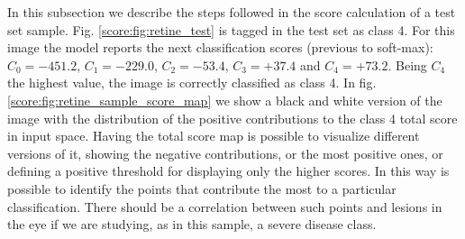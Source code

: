 In this subsection we describe the steps followed in the score calculation of a test set sample. Fig. \ref{score:fig:retine_test} is tagged in the test set as class 4. For this image the model reports the next classification scores (previous to soft-max): $C_0 = -451.2$, $C_1 = -229.0$, $C_2 = -53.4$, $C_3 = +37.4$ and $C_4 = +73.2$. Being $C_4$ the highest value, the image is correctly classified as class 4. In fig. \ref{score:fig:retine_sample_score_map} we show a black and white version of the image with the distribution of the positive contributions to the class 4 total score in input space. Having the total score map is possible to visualize different versions of it, showing the negative contributions, or the most positive ones, or defining a positive threshold for displaying only the higher scores. In this way is possible to identify the points that contribute the most to a particular classification. There should be a correlation between such points and lesions in the eye if we are studying, as in this sample, a severe disease class.

